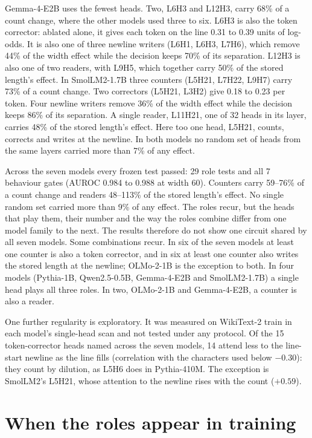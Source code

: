 \documentclass[11pt,a4paper]{article}
\begin{document}
Gemma-4-E2B uses the fewest heads. Two, L6H3 and L12H3, carry 68\% of a count change, where the other models used three to six. L6H3 is also the token corrector: ablated alone, it gives each token on the line 0.31 to 0.39 units of log-odds. It is also one of three newline writers (L6H1, L6H3, L7H6), which remove 44\% of the width effect while the decision keeps 70\% of its separation. L12H3 is also one of two readers, with L9H5, which together carry 50\% of the stored length's effect. In SmolLM2-1.7B three counters (L5H21, L7H22, L9H7) carry 73\% of a count change. Two correctors (L5H21, L3H2) give 0.18 to 0.23 per token. Four newline writers remove 36\% of the width effect while the decision keeps 86\% of its separation. A single reader, L11H21, one of 32 heads in its layer, carries 48\% of the stored length's effect. Here too one head, L5H21, counts, corrects and writes at the newline. In both models no random set of heads from the same layers carried more than 7\% of any effect.

Across the seven models every frozen test passed: 29 role tests and all 7 behaviour gates (AUROC 0.984 to 0.988 at width 60). Counters carry 59--76\% of a count change and readers 48--113\% of the stored length's effect. No single random set carried more than 9\% of any effect. The roles recur, but the heads that play them, their number and the way the roles combine differ from one model family to the next. The results therefore do not show one circuit shared by all seven models. Some combinations recur. In six of the seven models at least one counter is also a token corrector, and in six at least one counter also writes the stored length at the newline; OLMo-2-1B is the exception to both. In four models (Pythia-1B, Qwen2.5-0.5B, Gemma-4-E2B and SmolLM2-1.7B) a single head plays all three roles. In two, OLMo-2-1B and Gemma-4-E2B, a counter is also a reader.

One further regularity is exploratory. It was measured on WikiText-2 train in each model's single-head scan and not tested under any protocol. Of the 15 token-corrector heads named across the seven models, 14 attend less to the line-start newline as the line fills (correlation with the characters used below $-0.30$): they count by dilution, as L5H6 does in Pythia-410M. The exception is SmolLM2's L5H21, whose attention to the newline rises with the count ($+0.59$).

\section{When the roles appear in training}
\label{sec:training}
\end{document}
